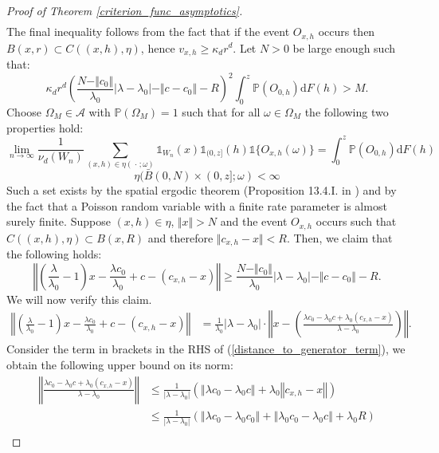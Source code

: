 \documentclass{article}
\newcommand{\PP}{\mathbb{P}}
\newcommand{\blank}{{\mspace{2mu}\cdot\mspace{2mu}}}
\theoremstyle{plain}
\theoremstyle{remark}
\theoremstyle{definition}
\begin{document}
\begin{proof}[Proof of Theorem \ref{criterion_func_asymptotics}]
\begin{align*}
    \end{align*}
    The final inequality follows from the fact that if the event $O_{x,h}$ occurs then $B(x,r) \subset C((x,h),\eta)$, hence $v_{x,h} \geq \kappa_d r^d$. Let $N > 0$ be large enough such that:
    \[\kappa_d r^d\left(\frac{N - \Vert c_0 \Vert}{\lambda_0}\left|\lambda-\lambda_0 \right| - \Vert c - c_0 \Vert - R \right)^2 \int_0^z \PP(O_{0,h})\mathrm{d}F(h) > M.\]
    Choose $\Omega_M \in \mathcal{A}$ with $\PP(\Omega_M) = 1$ such that for all $\omega \in \Omega_M$ the following two properties hold:
 \[\lim_{n \to \infty}\frac{1}{\nu_d(W_n)}\sum_{(x,h) \in \eta(\blank;\omega)} \mathds{1}_{W_n}(x)\mathds{1}_{(0,z]}(h)\mathds{1}\{O_{x,h}(\omega)\} = \int_0^z \PP(O_{0,h})\mathrm{d}F(h)\]
\[\eta(\bar{B}(0,N) \times (0,z];\omega) < \infty\]
Such a set exists by the spatial ergodic theorem (Proposition 13.4.I. in \cite{Daley2008}) and by the fact that a Poisson random variable with a finite rate parameter is almost surely finite. Suppose $(x,h) \in \eta$, $\Vert x \Vert > N$ and the event $O_{x,h}$ occurs such that $C((x,h),\eta) \subset B(x,R)$ and therefore $\Vert c_{x,h}-x\Vert < R$. Then, we claim that the following holds:
    \begin{equation}
        \left\Vert \left(\frac{\lambda}{\lambda_0}-1\right)x -\frac{\lambda c_0}{\lambda_0} + c - (c_{x,h}-x) \right\Vert \geq \frac{N-\Vert c_0 \Vert}{\lambda_0}|\lambda - \lambda_0| - \Vert c - c_0\Vert - R.\label{distance_term_lower_bound}
    \end{equation}
    We will now verify this claim.
    \begin{align}
        \left\Vert \left(\frac{\lambda}{\lambda_0}-1\right)x -\frac{\lambda c_0}{\lambda_0} + c - (c_{x,h}-x) \right\Vert &= \frac{1}{\lambda_0} \left|\lambda-\lambda_0 \right|\cdot \left\Vert x - \left(\frac{\lambda c_0 - \lambda_0 c + \lambda_0(c_{x,h}-x)}{\lambda - \lambda_0} \right) \right\Vert. \label{distance_to_generator_term}
    \end{align}
    Consider the term in brackets in the RHS of (\ref{distance_to_generator_term}), we obtain the following upper bound on its norm:
    \begin{align*}
        \left\Vert\frac{\lambda c_0 - \lambda_0 c + \lambda_0(c_{x,h}-x)}{\lambda - \lambda_0} \right\Vert &\leq \frac{1}{|\lambda - \lambda_0|}\left(\left\Vert \lambda c_0 - \lambda_0 c\right\Vert + \lambda_0 \left\Vert c_{x,h}-x \right\Vert \right) \\
        &\leq  \frac{1}{|\lambda - \lambda_0|}\left(\left\Vert \lambda c_0 - \lambda_0 c_0\right\Vert + \left\Vert \lambda_0c_0 - \lambda_0c \right\Vert + \lambda_0 R \right) \\

\end{align*}
\end{proof}
\end{document}
